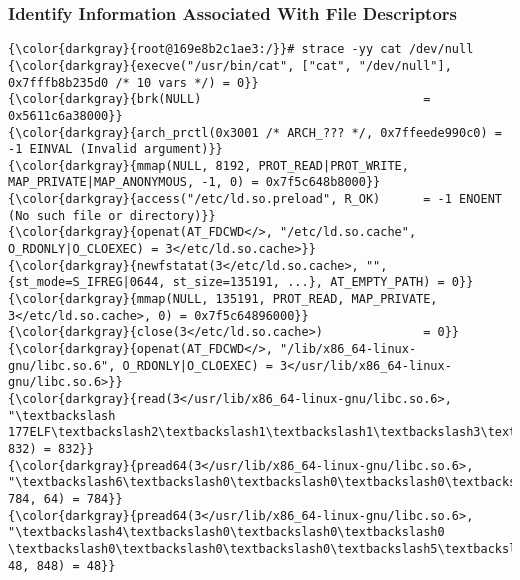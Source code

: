 		\subsubsection{Identify Information Associated With File Descriptors}
{\footnotesize{
\begin{Verbatim}[commandchars=\\\{\}]
{\color{darkgray}{root@169e8b2c1ae3:/}}# strace -yy cat /dev/null
{\color{darkgray}{execve("/usr/bin/cat", ["cat", "/dev/null"], 0x7fffb8b235d0 /* 10 vars */) = 0}}
{\color{darkgray}{brk(NULL)                               = 0x5611c6a38000}}
{\color{darkgray}{arch_prctl(0x3001 /* ARCH_??? */, 0x7ffeede990c0) = -1 EINVAL (Invalid argument)}}
{\color{darkgray}{mmap(NULL, 8192, PROT_READ|PROT_WRITE, MAP_PRIVATE|MAP_ANONYMOUS, -1, 0) = 0x7f5c648b8000}}
{\color{darkgray}{access("/etc/ld.so.preload", R_OK)      = -1 ENOENT (No such file or directory)}}
{\color{darkgray}{openat(AT_FDCWD</>, "/etc/ld.so.cache", O_RDONLY|O_CLOEXEC) = 3</etc/ld.so.cache>}}
{\color{darkgray}{newfstatat(3</etc/ld.so.cache>, "", {st_mode=S_IFREG|0644, st_size=135191, ...}, AT_EMPTY_PATH) = 0}}
{\color{darkgray}{mmap(NULL, 135191, PROT_READ, MAP_PRIVATE, 3</etc/ld.so.cache>, 0) = 0x7f5c64896000}}
{\color{darkgray}{close(3</etc/ld.so.cache>)              = 0}}
{\color{darkgray}{openat(AT_FDCWD</>, "/lib/x86_64-linux-gnu/libc.so.6", O_RDONLY|O_CLOEXEC) = 3</usr/lib/x86_64-linux-gnu/libc.so.6>}}
{\color{darkgray}{read(3</usr/lib/x86_64-linux-gnu/libc.so.6>, "\textbackslash 177ELF\textbackslash2\textbackslash1\textbackslash1\textbackslash3\textbackslash0\textbackslash0\textbackslash0\textbackslash0\textbackslash0\textbackslash0\textbackslash0\textbackslash0\textbackslash3\textbackslash0>\textbackslash0\textbackslash1\textbackslash0\textbackslash0\textbackslash0P\textbackslash237\textbackslash2\textbackslash0\textbackslash0\textbackslash0\textbackslash0\textbackslash0"..., 832) = 832}}
{\color{darkgray}{pread64(3</usr/lib/x86_64-linux-gnu/libc.so.6>, "\textbackslash6\textbackslash0\textbackslash0\textbackslash0\textbackslash4\textbackslash0\textbackslash0\textbackslash0@\textbackslash0\textbackslash0\textbackslash0\textbackslash0\textbackslash0\textbackslash0\textbackslash0@\textbackslash0\textbackslash0\textbackslash0\textbackslash0\textbackslash0\textbackslash0\textbackslash0@\textbackslash0\textbackslash0\textbackslash0\textbackslash0\textbackslash0\textbackslash0\textbackslash0"..., 784, 64) = 784}}
{\color{darkgray}{pread64(3</usr/lib/x86_64-linux-gnu/libc.so.6>, "\textbackslash4\textbackslash0\textbackslash0\textbackslash0 \textbackslash0\textbackslash0\textbackslash0\textbackslash5\textbackslash0\textbackslash0\textbackslash0GNU\textbackslash0\textbackslash2\textbackslash0\textbackslash0\textbackslash300\textbackslash4\textbackslash0\textbackslash0\textbackslash0\textbackslash3\textbackslash0\textbackslash0\textbackslash0\textbackslash0\textbackslash0\textbackslash0\textbackslash0"..., 48, 848) = 48}}

\end{Verbatim}}}
